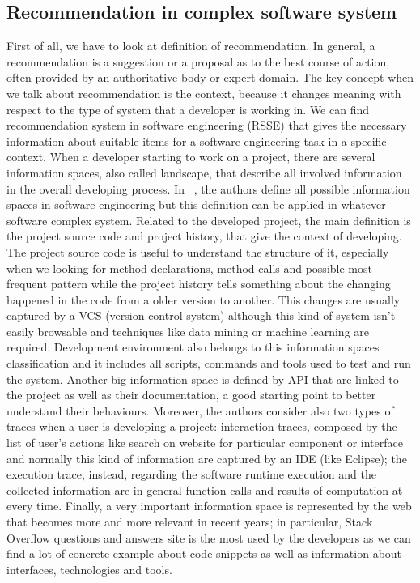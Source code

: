 \subsection{Recommendation in complex software system}
First of all, we have to look at definition of recommendation.  In general, a recommendation is a suggestion or a proposal as to the best course of action, often provided by an authoritative body or expert domain. The key concept when we talk about recommendation is the context, because it changes meaning with respect to the type of system that a developer is working in. 
We can find recommendation system in software engineering (RSSE) that gives the necessary information about suitable items for a software engineering task in a specific context. When a developer starting to work on a project, there are several information spaces, also called landscape, that describe all involved information in the overall developing process. In  ~\cite{martin_p.robillard_introduction_2009}, the authors define all possible information spaces in software engineering but this definition can be applied in whatever software complex system. Related to the developed project, the main definition is the project source code and project history, that give the context of developing. The project source code is useful to understand the structure of it, especially when we looking for method declarations, method calls and possible most frequent pattern while the project history tells something about the changing happened in the code from a older version to another. This changes are usually captured by a VCS (version control system) although this kind of system isn't easily browsable and techniques like data mining or machine learning are required. Development environment also belongs to this information spaces classification and it includes all scripts, commands and tools used to test and run the system. Another big information space is defined by API that are linked to the project as well as their documentation, a good starting point to better understand their behaviours. Moreover, the authors consider also two types of traces when a user is developing a project: interaction traces, composed by the list of user's actions like search on website for particular component or interface and normally this kind of information are captured by an IDE (like Eclipse); the execution trace, instead, regarding the software runtime execution and the collected information are in general function calls and results of computation at every time. Finally, a very important information space is represented by the web that becomes more and more relevant in recent years; in particular, Stack Overflow questions and answers site is the most used by the developers as we can find a lot of concrete example about code snippets as well as information about interfaces, technologies and tools. \newline
